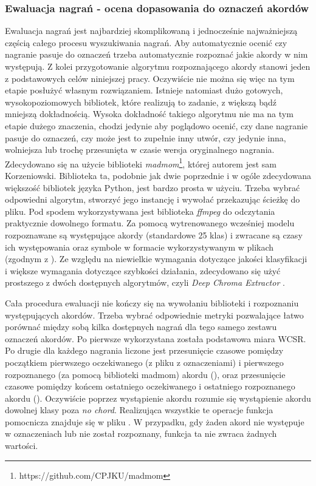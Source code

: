 \subsubsection{Ewaluacja nagrań - ocena dopasowania do oznaczeń akordów}
Ewaluacja nagrań jest najbardziej skomplikowaną i jednocześnie najważniejszą częścią całego procesu
wyszukiwania nagrań. Aby automatycznie ocenić czy nagranie pasuje do oznaczeń trzeba automatycznie
rozpoznać jakie akordy w nim występują. Z kolei przygotowanie algorytmu rozpoznającego akordy
stanowi jeden z podstawowych celów niniejszej pracy. Oczywiście nie można się więc na tym etapie
posłużyć własnym rozwiązaniem. Istnieje natomiast dużo gotowych, wysokopoziomowych bibliotek, które
realizują to zadanie, z większą bądź mniejszą dokładnością. Wysoka dokładność takiego algorytmu nie
ma na tym etapie dużego znaczenia, chodzi jedynie aby poglądowo ocenić, czy dane nagranie pasuje do
oznaczeń, czy może jest to zupełnie inny utwór, czy jedynie inna, wolniejsza lub trochę przesunięta
w czasie wersja oryginalnego nagrania. Zdecydowano się na użycie biblioteki
\emph{madmom}\footnote{https://github.com/CPJKU/madmom}, której autorem jest sam Korzeniowski.
Biblioteka ta, podobnie jak dwie poprzednie i w ogóle zdecydowana większość bibliotek języka Python,
jest bardzo prosta w użyciu. Trzeba wybrać odpowiedni algorytm, stworzyć jego instancję i wywołać
przekazując ścieżkę do pliku. Pod spodem wykorzystywana jest biblioteka \emph{ffmpeg} do odczytania
praktycznie dowolnego formatu. Za pomocą wytrenowanego wcześniej modelu rozpoznawane są występujące
akordy (standardowe 25 klas) i zwracane są czasy ich występowania oraz symbole w formacie
wykorzystywanym w plikach  (zgodnym z \cite{harte_towards_nodate}). Ze względu na
niewielkie wymagania dotyczące jakości klasyfikacji i większe wymagania dotyczące szybkości
działania, zdecydowano się użyć prostszego z dwóch dostępnych algorytmów, czyli \emph{Deep Chroma
Extractor} \cite{korzeniowski_feature_2016}.

Cała procedura ewaluacji nie kończy się na wywołaniu biblioteki i rozpoznaniu występujących akordów.
Trzeba wybrać odpowiednie metryki pozwalające łatwo porównać między sobą kilka dostępnych nagrań dla
tego samego zestawu oznaczeń akordów. Po pierwsze wykorzystana została podstawowa miara WCSR. Po drugie
dla każdego nagrania liczone jest przesunięcie czasowe pomiędzy początkiem pierwszego oczekiwanego
(z pliku z oznaczeniami) i pierwszego rozpoznanego (za pomocą biblioteki madmom) akordu
(), oraz przesunięcie czasowe pomiędzy końcem ostatniego oczekiwanego i ostatniego
rozpoznanego akordu (). Oczywiście poprzez wystąpienie akordu rozumie się
wystąpienie akordu dowolnej klasy poza \emph{no chord}. Realizująca wszystkie te operacje funkcja
pomocnicza znajduje się w pliku . W przypadku, gdy żaden akord
nie występuje w oznaczeniach lub nie został rozpoznany, funkcja ta nie zwraca żadnych wartości.


